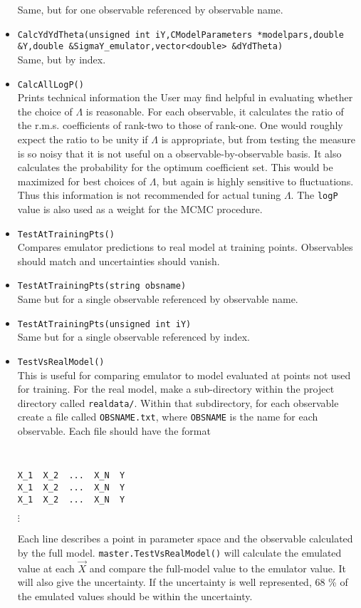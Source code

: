 \documentclass[UserManual.tex]{subfiles}
\begin{document}
\begin{itemize}
Same, but for one observable referenced by observable name.
\item {\tt CalcYdYdTheta(unsigned int iY,CModelParameters *modelpars,double \&Y,double \&SigmaY\_emulator,vector<double> \&dYdTheta)}\\
Same, but by index.
\item {\tt CalcAllLogP()}\\
Prints technical information the User may find helpful in evaluating whether the choice of $\Lambda$ is reasonable. For each observable, it calculates the ratio of the r.m.s. coefficients of rank-two to those of rank-one. One would roughly expect the ratio to be unity if $\Lambda$ is appropriate, but from testing the measure is so noisy that it is not useful on a observable-by-observable basis. It also calculates the probability for the optimum coefficient set. This would be maximized for best choices of $\Lambda$, but again is highly sensitive to fluctuations. Thus this information is not recommended for actual tuning $\Lambda$. The {\tt logP} value is also used as a weight for the MCMC procedure.
\item {\tt TestAtTrainingPts()}\\
Compares emulator predictions to real model at training points. Observables should match and uncertainties should vanish.
\item {\tt TestAtTrainingPts(string obsname)}\\
Same but for a single observable referenced by observable name.
\item {\tt TestAtTrainingPts(unsigned int iY)}\\
Same but for a single observable referenced by index.
\item {\tt TestVsRealModel()}\\
This is useful for comparing emulator to model evaluated at points not used for training. For the real model, make a sub-directory within the project directory called {\tt realdata/}. Within that subdirectory, for each observable create a file called {\tt OBSNAME.txt}, where {\tt OBSNAME} is the name for each observable. Each file should have the format
{\tt
\begin{verbatim}
X_1  X_2  ...  X_N  Y
X_1  X_2  ...  X_N  Y
X_1  X_2  ...  X_N  Y
\end{verbatim}}
\hspace*{36pt}$\vdots$

Each line describes a point in parameter space and the observable calculated by the full model. {\tt master.TestVsRealModel()} will calculate the emulated value at each $\vec{X}$ and compare the full-model value to the emulator value. It will also give the uncertainty. If the uncertainty is well represented, 68 \% of the emulated values should be within the uncertainty.


\end{itemize}
\end{document}
